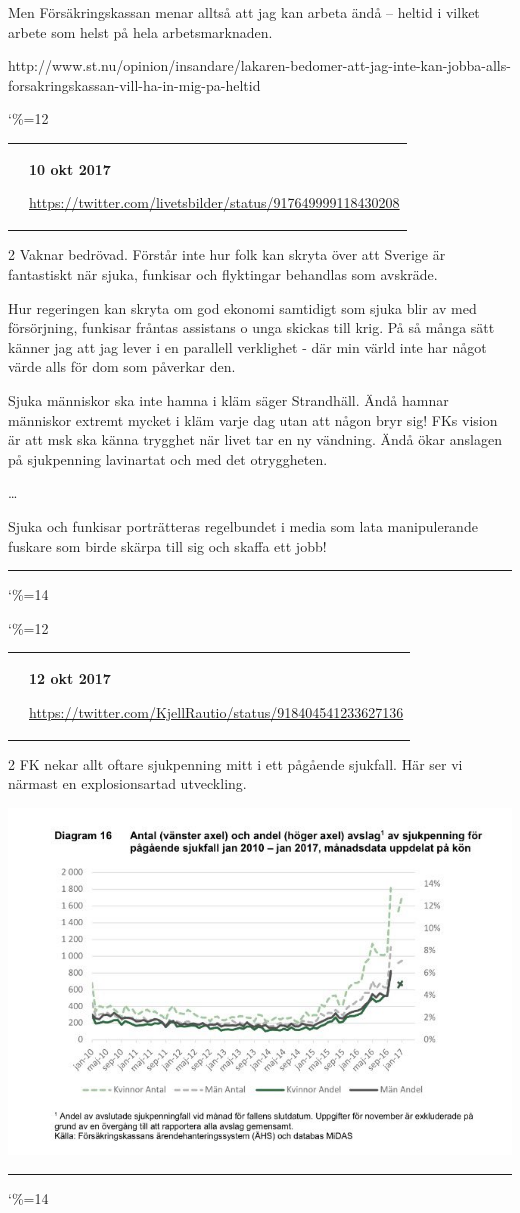 \documentclass[a4paper]{article}
\makeatletter
\newcommand{\entry}{
\catcode`\%=12
\@entry}
\newcommand{\@entry}[4][]{
\bigskip
\begin{tabular*}{\textwidth}{l m{\textwidth-4cm}}
\qrcode{#4} & \textbf{#2}

\medskip

\url{#4}

\end{tabular*}

\medskip


\begin{multicols}{2}
#3
\end{multicols}

#1

\medskip
\hrule

\catcode`\%=14
}
\makeatother
\begin{document}
{{{

Men Försäkringskassan menar alltså att jag kan arbeta ändå – heltid i vilket arbete som helst på hela arbetsmarknaden.}{http://www.st.nu/opinion/insandare/lakaren-bedomer-att-jag-inte-kan-jobba-alls-forsakringskassan-vill-ha-in-mig-pa-heltid}

\entry{10 okt 2017}{Vaknar bedrövad. Förstår inte hur folk kan skryta över att Sverige är fantastiskt när sjuka, funkisar och flyktingar behandlas som avskräde.

Hur regeringen kan skryta om god ekonomi samtidigt som sjuka blir av med försörjning, funkisar fråntas assistans o unga skickas till krig.
På så många sätt känner jag att jag lever i en parallell verklighet - där min värld inte har något värde alls för dom som påverkar den.

Sjuka människor ska inte hamna i kläm säger Strandhäll. Ändå hamnar människor extremt mycket i kläm varje dag utan att någon bryr sig!
FKs vision är att msk ska känna trygghet när livet tar en ny vändning. Ändå ökar anslagen på sjukpenning lavinartat och med det otryggheten.

\ldots

Sjuka och funkisar porträtteras regelbundet i media som lata manipulerande fuskare som birde skärpa till sig och skaffa ett jobb!
}{https://twitter.com/livetsbilder/status/917649999118430208}

\entry[{\includegraphics[width=\textwidth,height=\textheight,keepaspectratio]{diagram16.jpg}}]{12 okt 2017}{FK nekar allt oftare sjukpenning mitt i ett pågående sjukfall. Här ser vi närmast en explosionsartad utveckling.}{https://twitter.com/KjellRautio/status/918404541233627136}

}}
\end{document}
